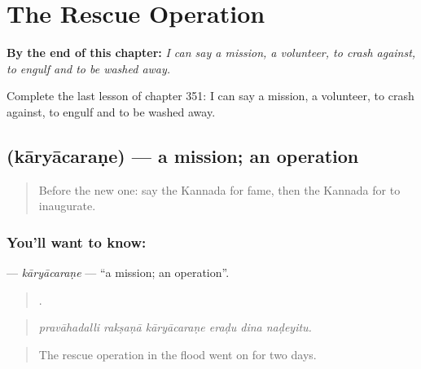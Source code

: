 
\chapter{The Rescue Operation}
\label{ch:ka-the-rescue-operation}

\begin{chapteropening}
\textbf{By the end of this chapter:} \emph{I can say a mission, a volunteer, to crash against, to engulf and to be washed away.}

Complete the last lesson of chapter 351: I can say a mission, a volunteer, to crash against, to engulf and to be washed away.
\end{chapteropening}

\section[\texorpdfstring{\kn{ಕಾರ್ಯಾಚರಣೆ} (kāryācaraṇe)}{ಕಾರ್ಯಾಚರಣೆ (kāryācaraṇe)}]{ (kāryācaraṇe) — a mission; an operation}

\label{lesson:KA-C351-karyacarane}



\begin{quote}
Before the new one: say the Kannada for fame, then the Kannada for to inaugurate.
\end{quote}

\subsection*{You'll want to know: }
\textbf{} — \emph{kāryācaraṇe} — \textquotedblleft{}a mission; an operation\textquotedblright{}.

\begin{quote}
     .
\end{quote}

\begin{quote}
\emph{pravāhadalli rakṣaṇā kāryācaraṇe eraḍu dina naḍeyitu.}
\end{quote}

\begin{quote}
The rescue operation in the flood went on for two days.
\end{quote}

